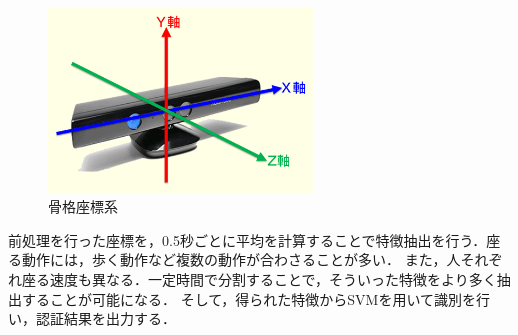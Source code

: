 \begin{figure}[htbp]
  \begin{center}
    \includegraphics[clip,width=7.0cm]{./images/zahyo.png}
    \caption{骨格座標系}
    \label{fig:zahyo}
  \end{center}
\end{figure}

前処理を行った座標を，0.5秒ごとに平均を計算することで特徴抽出を行う．座る動作には，歩く動作など複数の動作が合わさることが多い．
また，人それぞれ座る速度も異なる．一定時間で分割することで，そういった特徴をより多く抽出することが可能になる．
そして，得られた特徴からSVMを用いて識別を行い，認証結果を出力する．